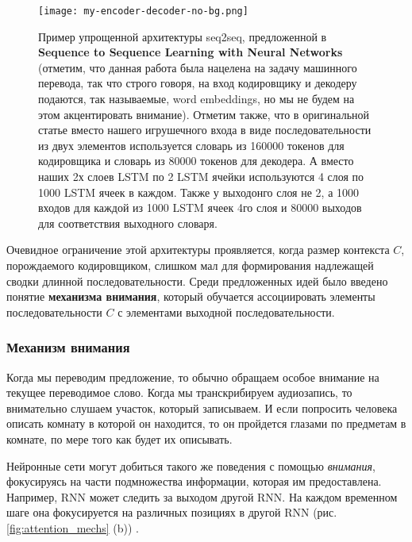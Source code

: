 \begin{figure}[h!]
    \centering
    \texttt{[image: my-encoder-decoder-no-bg.png]}
    \caption{Пример упрощенной архитектуры seq2seq, предложенной в 
    \textbf{Sequence to Sequence Learning with Neural Networks} \cite{seq2seq} 
    (отметим, 
    что данная работа была нацелена на задачу машинного перевода, так 
    что строго говоря, на вход кодировщику и декодеру подаются, 
    так называемые, word embeddings, но мы не будем на этом акцентировать внимание). 
    Отметим также, что в оригинальной статье вместо нашего игрушечного входа в виде 
    последовательности из двух элементов используется словарь из 160000 токенов 
    для кодировщика и словарь из 80000 токенов для декодера. А вместо наших 
    2х слоев LSTM по 2 LSTM ячейки используются 4 слоя по 1000 LSTM ячеек в 
    каждом. Также у выходонго слоя не 2, а 1000 входов для каждой из 1000 LSTM 
    ячеек 4го слоя и 80000 выходов для соответствия выходного словаря.}
    \label{fig:my-encoder-decoder}
\end{figure}

\newpage

Очевидное ограничение этой архитектуры проявляется, когда размер контекста $C$,
порождаемого кодировщиком, слишком мал для формирования надлежащей сводки
длинной последовательности. Среди предложенных идей было введено понятие 
\textbf{механизма внимания}, 
который обучается ассоциировать элементы 
последовательности $C$ с элементами выходной последовательности.

\subsubsection{Механизм внимания}

Когда мы переводим предложение, то обычно обращаем особое внимание на текущее 
переводимое слово. Когда мы транскрибируем аудиозапись, то внимательно слушаем 
участок, который записываем. И если попросить человека описать комнату в которой он 
находится, то он пройдется глазами по предметам в комнате, 
по мере того как будет их описывать.

Нейронные сети могут добиться такого же поведения с помощью \textit{внимания}, 
фокусируясь на части подмножества информации, которая им предоставлена. 
Например, RNN может следить за выходом другой RNN. На каждом временном шаге 
она фокусируется на различных позициях в другой RNN (рис. \ref{fig:attention_mechs} (b)) 
\cite{olah2016attention}.

